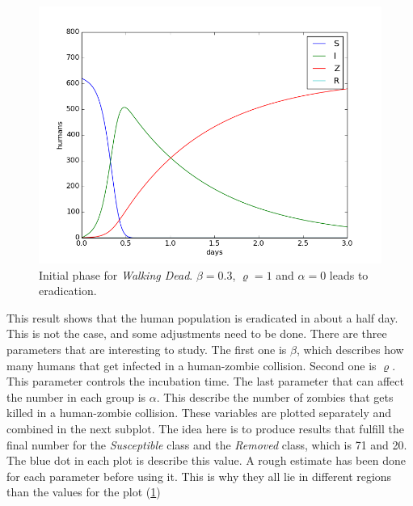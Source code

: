 \documentclass[%
twoside,                 %
final,                   %
10pt]{article}
\begin{document}
\begin{figure}[ht]
  \centerline{\includegraphics[width=0.9\linewidth]{plots/WD_zombie_initial_1.png}}
  \caption{
  \label{fig:initial_phase_1} Initial phase for \emph{Walking Dead}. $\beta=0.3$, $\varrho=1$ and $\alpha=0$ leads to eradication.
  }
\end{figure}


This result shows that the human population is eradicated in about a half day. This is not the case, and some adjustments need to be done. There are three parameters that are interesting to study. The first one is $\beta$, which describes how many humans that get infected in a human-zombie collision. Second one is $\varrho$. This parameter controls the incubation time. The last parameter that can affect the number in each group is $\alpha$. This describe the number of zombies that gets killed in a human-zombie collision. These variables are plotted separately and combined in the next subplot. The idea here is to produce results that fulfill the final number for the \emph{Susceptible} class and the \emph{Removed} class, which is 71 and 20. The blue dot in each plot is describe this value. A rough estimate has been done for each parameter before using it. This is why they all lie in different regions than the values for the plot (\ref{fig:initial_phase_1})
\end{document}
